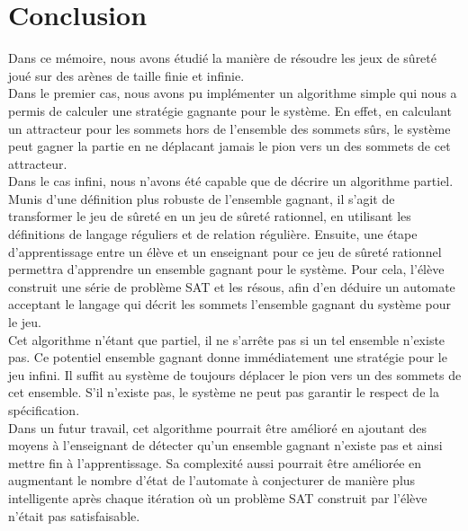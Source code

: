\documentclass[12pt,a4paper,oneside,titlepage]{report}
\begin{document}
\chapter*{Conclusion}
\renewcommand{\leftmark}{CONCLUSION}
Dans ce mémoire, nous avons étudié la manière de résoudre les jeux de sûreté joué sur des arènes de taille finie et infinie.\\

Dans le premier cas, nous avons pu implémenter un algorithme simple qui nous a permis de calculer une stratégie gagnante pour le système. En effet, en calculant un attracteur pour les sommets hors de l'ensemble des sommets sûrs, le système peut gagner la partie en ne déplacant jamais le pion vers un des sommets de cet attracteur.\\

Dans le cas infini, nous n'avons été capable que de décrire un algorithme partiel. Munis d'une définition plus robuste de l'ensemble gagnant, il s'agit de transformer le jeu de sûreté en un jeu de sûreté rationnel, en utilisant les définitions de langage réguliers et de relation régulière. Ensuite, une étape d'apprentissage entre un élève et un enseignant pour ce jeu de sûreté rationnel permettra d'apprendre un ensemble gagnant pour le système. Pour cela, l'élève construit une série de problème SAT et les résous, afin d'en déduire un automate acceptant le langage qui décrit les sommets l'ensemble gagnant du système pour le jeu.\\
Cet algorithme n'étant que partiel, il ne s'arrête pas si un tel ensemble n'existe pas. Ce potentiel ensemble gagnant donne immédiatement une stratégie pour le jeu infini. Il suffit au système de toujours déplacer le pion vers un des sommets de cet ensemble. S'il n'existe pas, le système ne peut pas garantir le respect de la spécification.\\

Dans un futur travail, cet algorithme pourrait être amélioré en ajoutant des moyens à l'enseignant de détecter qu'un ensemble gagnant n'existe pas et ainsi mettre fin à l'apprentissage. Sa complexité aussi pourrait être améliorée en augmentant le nombre d'état de l'automate à conjecturer de manière plus intelligente après chaque itération où un problème SAT construit par l'élève n'était pas satisfaisable.\\

\newpage




\end{document}
